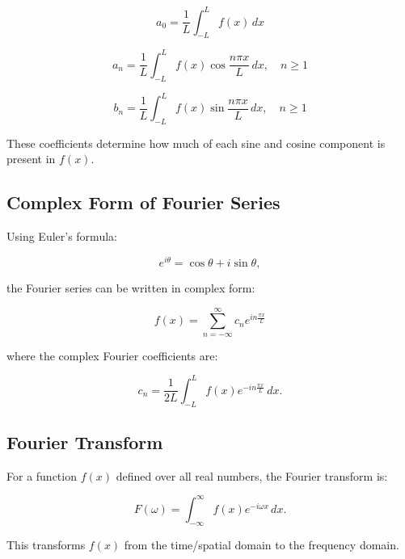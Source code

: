 \documentclass[../Main.tex]{subfiles}
\begin{document}
\begin{equation}
a_0 = \frac{1}{L} \int_{-L}^{L} f(x) \, dx
\end{equation}

\begin{equation}
a_n = \frac{1}{L} \int_{-L}^{L} f(x) \cos \frac{n\pi x}{L} \, dx, \quad n \geq 1
\end{equation}

\begin{equation}
b_n = \frac{1}{L} \int_{-L}^{L} f(x) \sin \frac{n\pi x}{L} \, dx, \quad n \geq 1
\end{equation}

These coefficients determine how much of each sine and cosine component is present in $f(x)$.

\subsection{Complex Form of Fourier Series}

Using Euler’s formula:

\begin{equation}
e^{i\theta} = \cos\theta + i\sin\theta,
\end{equation}

the Fourier series can be written in complex form:

\begin{equation}
f(x) = \sum_{n=-\infty}^{\infty} c_n e^{i n \frac{\pi x}{L}}
\end{equation}

where the complex Fourier coefficients are:

\begin{equation}
c_n = \frac{1}{2L} \int_{-L}^{L} f(x) e^{-i n \frac{\pi x}{L}} \, dx.
\end{equation}

\subsection{Fourier Transform}

For a function $f(x)$ defined over all real numbers, the Fourier transform is:

\begin{equation}
F(\omega) = \int_{-\infty}^{\infty} f(x) e^{-i\omega x} \, dx.
\end{equation}

This transforms $f(x)$ from the time/spatial domain to the frequency domain.
\end{document}
